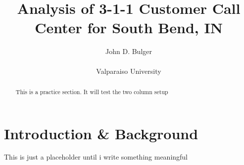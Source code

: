 \documentclass[11pt,twocolumn]{article}
\title{Analysis of 3-1-1 Customer Call Center for South Bend, IN}
\author{John D. Bulger\\
\\
Valparaiso University\\
}
\begin{document}
\maketitle
\thispagestyle{empty}
\begin{abstract}
This is a practice section.  It will test the two column setup
\end{abstract}
\section{Introduction \& Background}
This is just a placeholder until i write something meaningful
\end{document}
